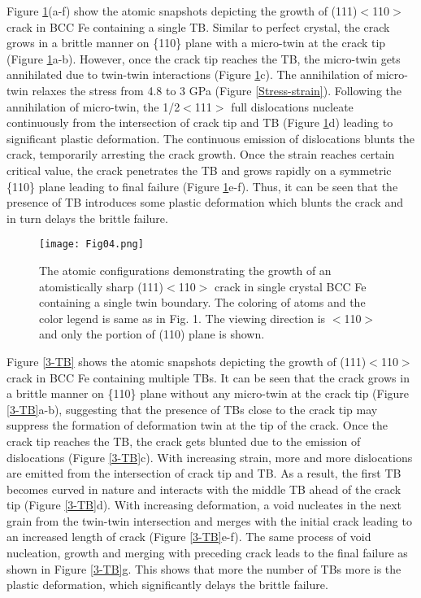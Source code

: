 \documentclass[smallextended]{svjour3}       %
\renewcommand\hl[1]{#1}
\begin{document}
Figure \ref{1-TB}(a-f) show the atomic snapshots depicting the growth of (111)$<$110$>$ crack in BCC Fe containing a single TB. Similar 
to perfect crystal, the crack grows in a brittle manner on \{110\} plane with a micro-twin at the crack tip (Figure \ref{1-TB}a-b). 
However, once the crack tip reaches the TB, the micro-twin gets annihilated due to twin-twin interactions (Figure \ref{1-TB}c). The 
annihilation of micro-twin relaxes the stress from 4.8 to 3 GPa (Figure \ref{Stress-strain}). Following the annihilation of micro-twin, 
the 1/2$<$111$>$ full dislocations nucleate continuously from the intersection of crack tip and TB (Figure \ref{1-TB}d) leading to 
significant plastic deformation. The continuous emission of dislocations blunts the crack, temporarily arresting the crack growth. 
Once the strain reaches certain critical value, the crack penetrates the TB and grows rapidly on a symmetric \{110\} plane leading 
to final failure (Figure \ref{1-TB}e-f). Thus, it can be seen that the presence of TB introduces some plastic deformation which blunts 
the crack and in turn delays the brittle failure.  

\begin{figure}[h]
\centering
\texttt{[image: Fig04.png]}
\caption {\small The atomic configurations demonstrating the growth of an atomistically sharp (111)$<$110$>$ crack in single crystal 
BCC Fe containing a single twin boundary. \hl{The coloring of atoms and the color legend is same as in Fig. 1. The viewing direction 
is $<$110$>$ and only the portion of (110) plane is shown.}}
\label{1-TB}
\end{figure}

Figure \ref{3-TB} shows the atomic snapshots depicting the growth of (111)$<$110$>$ crack in BCC Fe containing multiple TBs. It can 
be seen that the crack grows in a brittle manner on \{110\} plane without any micro-twin at the crack tip (Figure \ref{3-TB}a-b), 
suggesting that the presence of TBs close to the crack tip may suppress the formation of deformation twin at the tip of the crack. 
Once the crack tip reaches the TB, the crack gets blunted due to the emission of dislocations (Figure \ref{3-TB}c). With increasing 
strain, more and more dislocations are emitted from the intersection of crack tip and TB. As a result, the first TB becomes curved in 
nature and interacts with the middle TB ahead of the crack tip (Figure \ref{3-TB}d). With increasing deformation, a void nucleates 
in the next grain from the twin-twin intersection and merges with the initial crack leading to an increased length of crack (Figure 
\ref{3-TB}e-f). The same process of void nucleation, growth and merging with preceding crack leads to the final failure as shown in 
Figure \ref{3-TB}g. This shows that more the number of TBs more is the plastic deformation, which significantly delays the 
brittle failure. 
\end{document}
